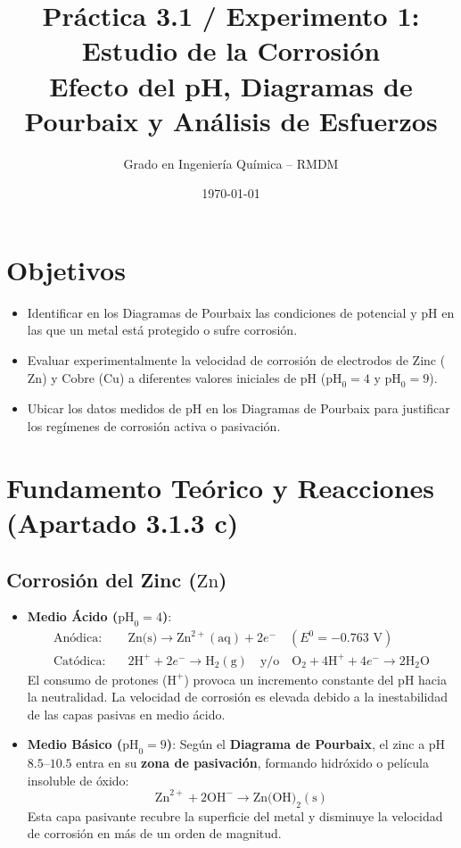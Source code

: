 \documentclass[11pt,a4paper]{article}
\title{\textbf{Práctica 3.1 / Experimento 1: Estudio de la Corrosión}\\[0.3em]\large Efecto del pH, Diagramas de Pourbaix y Análisis de Esfuerzos}
\author{Grado en Ingeniería Química -- RMDM}
\date{\today}
\begin{document}
\maketitle

\section{Objetivos}
\begin{itemize}
    \item Identificar en los Diagramas de Pourbaix las condiciones de potencial y pH en las que un metal está protegido o sufre corrosión.
    \item Evaluar experimentalmente la velocidad de corrosión de electrodos de Zinc ($\text{Zn}$) y Cobre ($\text{Cu}$) a diferentes valores iniciales de pH ($\text{pH}_0 = 4$ y $\text{pH}_0 = 9$).
    \item Ubicar los datos medidos de pH en los Diagramas de Pourbaix para justificar los regímenes de corrosión activa o pasivación.
\end{itemize}

\section{Fundamento Teórico y Reacciones (Apartado 3.1.3 c)}

\subsection{Corrosión del Zinc ($\text{Zn}$)}
\begin{itemize}
    \item \textbf{Medio Ácido ($\text{pH}_0 = 4$)}:
    \begin{align}
        \text{Anódica:} \quad & \text{Zn(s)} \rightarrow \text{Zn}^{2+}(\text{aq}) + 2e^- \quad (E^0 = -0.763 \text{ V}) \\
        \text{Catódica:} \quad & 2\text{H}^+ + 2e^- \rightarrow \text{H}_2(\text{g}) \quad \text{y/o} \quad \text{O}_2 + 4\text{H}^+ + 4e^- \rightarrow 2\text{H}_2\text{O}
    \end{align}
    El consumo de protones ($\text{H}^+$) provoca un incremento constante del pH hacia la neutralidad. La velocidad de corrosión es elevada debido a la inestabilidad de las capas pasivas en medio ácido.

    \item \textbf{Medio Básico ($\text{pH}_0 = 9$)}:
    Según el \textbf{Diagrama de Pourbaix}, el zinc a pH $8.5$--$10.5$ entra en su \textbf{zona de pasivación}, formando hidróxido o película insoluble de óxido:
    \begin{equation}
        \text{Zn}^{2+} + 2\text{OH}^- \rightarrow \text{Zn(OH)}_2(\text{s})
    \end{equation}
    Esta capa pasivante recubre la superficie del metal y disminuye la velocidad de corrosión en más de un orden de magnitud.
\end{itemize}
\end{document}
